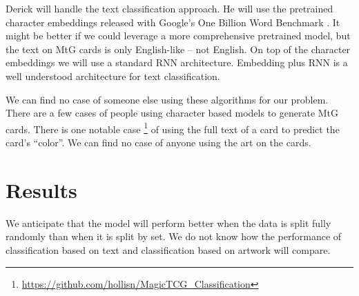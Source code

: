 \documentclass{article}
\begin{document}
Derick will handle the text classification approach.
He will use the pretrained character embeddings
released with Google's One Billion Word Benchmark
\cite{one-billion-words}.
It might be better if we could leverage a more comprehensive pretrained model,
but the text on MtG cards is only English-like -- not English.
On top of the character embeddings
we will use a standard RNN architecture.
Embedding plus RNN is a well understood architecture for text classification.

We can find no case of someone else using these algorithms for our problem.
There are a few cases of people using character based models
to generate MtG cards.
There is one notable case
\footnote{\url{https://github.com/hollisn/MagicTCG_Classification}}
of using the full text of a card to predict the card's ``color''.
We can find no case of anyone using the art on the cards.

\section*{Results}

We anticipate that the model will perform better
when the data is split fully randomly
than when it is split by set.
We do not know how the performance of
classification based on text
and classification based on artwork will compare.


{}

\end{document}

